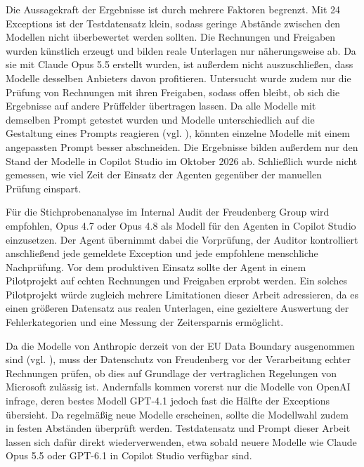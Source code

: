 Die Aussagekraft der Ergebnisse ist durch mehrere Faktoren begrenzt. Mit 24 Exceptions ist der Testdatensatz klein, sodass geringe Abstände zwischen den Modellen nicht überbewertet werden sollten. Die Rechnungen und Freigaben wurden künstlich erzeugt und bilden reale Unterlagen nur näherungsweise ab. Da sie mit Claude Opus 5.5 erstellt wurden, ist außerdem nicht auszuschließen, dass Modelle desselben Anbieters davon profitieren. Untersucht wurde zudem nur die Prüfung von Rechnungen mit ihren Freigaben, sodass offen bleibt, ob sich die Ergebnisse auf andere Prüffelder übertragen lassen. Da alle Modelle mit demselben Prompt getestet wurden und Modelle unterschiedlich auf die Gestaltung eines Prompts reagieren (vgl. \cite[S.~6]{sclar2024quantifying}), könnten einzelne Modelle mit einem angepassten Prompt besser abschneiden. Die Ergebnisse bilden außerdem nur den Stand der Modelle in Copilot Studio im Oktober 2026 ab. Schließlich wurde nicht gemessen, wie viel Zeit der Einsatz der Agenten gegenüber der manuellen Prüfung einspart.

Für die Stichprobenanalyse im Internal Audit der Freudenberg Group wird empfohlen, Opus 4.7 oder Opus 4.8 als Modell für den Agenten in Copilot Studio einzusetzen. Der Agent übernimmt dabei die Vorprüfung, der Auditor kontrolliert anschließend jede gemeldete Exception und jede empfohlene menschliche Nachprüfung. Vor dem produktiven Einsatz sollte der Agent in einem Pilotprojekt auf echten Rechnungen und Freigaben erprobt werden. Ein solches Pilotprojekt würde zugleich mehrere Limitationen dieser Arbeit adressieren, da es einen größeren Datensatz aus realen Unterlagen, eine gezieltere Auswertung der Fehlerkategorien und eine Messung der Zeitersparnis ermöglicht.

Da die Modelle von Anthropic derzeit von der EU Data Boundary ausgenommen sind (vgl. \cite{Microsoft2026Anthropic}), muss der Datenschutz von Freudenberg vor der Verarbeitung echter Rechnungen prüfen, ob dies auf Grundlage der vertraglichen Regelungen von Microsoft zulässig ist. Andernfalls kommen vorerst nur die Modelle von OpenAI infrage, deren bestes Modell GPT-4.1 jedoch fast die Hälfte der Exceptions übersieht. Da regelmäßig neue Modelle erscheinen, sollte die Modellwahl zudem in festen Abständen überprüft werden. Testdatensatz und Prompt dieser Arbeit lassen sich dafür direkt wiederverwenden, etwa sobald neuere Modelle wie Claude Opus 5.5 oder GPT-6.1 in Copilot Studio verfügbar sind.